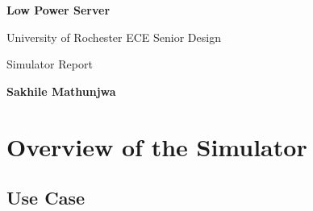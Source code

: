 \documentclass[letterpaper, 11pt, twoside]{article}
\begin{document}
\begin{titlepage}
	\begin{center}

	\vspace*{1cm}
	\Huge
	\textbf{Low Power Server}

	\vspace{0.5cm}
	\LARGE
	University of Rochester ECE Senior Design 

	\vspace{1cm}
	\LARGE
	Simulator Report
	\vspace{1.5cm}
	
	\textbf{Sakhile Mathunjwa} 
	\vfill
	
	
	\end{center}

\end{titlepage}


\cleardoublepage



\tableofcontents
\setcounter{page}{1}
\cleardoublepage

\section[Overview]{Overview of the Simulator}

\paragraph{}

\subsection{Use Case}
\end{document}
